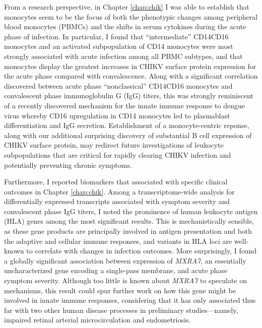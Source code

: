 From a research perspective, in Chapter \ref{chap:chik} I was able to establish that monocytes seem to be the focus of both the phenotypic changes among peripheral blood monocytes (PBMCs) and the shifts in serum cytokines during the acute phase of infection. In particular, I found that ``intermediate'' CD14\sups{++}\allowbreak CD16\sups{+} monocytes and an activated subpopulation of CD14\sups{+} monocytes were most strongly associated with acute infection among all PBMC subtypes, and that monocytes display the greatest increases in CHIKV surface protein expression for the acute phase compared with convalescence. Along with a significant correlation discovered between acute phase ``nonclassical'' CD14\sups{+}CD16\sups{++} monocytes and convalescent phase immunoglobulin G (IgG) titers, this was strongly reminiscent of a recently discovered mechanism for the innate immune response to dengue virus whereby CD16 upregulation in CD14\sups{+} monocytes led to plasmablast differentiation and IgG secretion.\autocite{Kwissa2014} Establishment of a monocyte-centric reponse, along with our additional surprising discovery of substantial B cell expression of CHIKV surface protein, may redirect future investigations of leukocyte subpopulations that are critical for rapidly clearing CHIKV infection and potentially preventing chronic symptoms.

Furthermore, I reported biomarkers that associated with specific clinical outcomes in Chapter \ref{chap:chik}. Among a transcriptome-wide analysis for differentially expressed transcripts associated with symptom severity and convalescent phase IgG titers, I noted the prominence of human leukocyte antigen (HLA) genes among the most significant results. This is mechanistically sensible, as these gene products are principally involved in antigen presentation and both the adaptive and cellular immune responses, and variants in HLA loci are well-known to correlate with changes in infection outcomes. More surprisingly, I found a globally significant association between expression of \emph{MXRA7}, an essentially uncharacterized gene encoding a single-pass membrane, and acute phase symptom severity. Although too little is known about \emph{MXRA7} to speculate on mechanisms, this result could spur further work on how this gene might be involved in innate immune responses, considering that it has only associated thus far with two other human disease processes in preliminary studies—namely, impaired retinal arterial microcirculation and endometriosis.\autocite{Sim2013,Veiga-Castelli2010}

